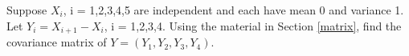 \oneproblem
Suppose $X_i$, i = 1,2,3,4,5 are independent and each have mean 0 and   
variance 1.  Let $Y_i = X_{i+1} - X_i$, i = 1,2,3,4.  Using the 
material in Section \ref{matrix}, find the covariance matrix of 
$Y = (Y_1, Y_2, Y_3, Y_4)$.

% 
% 
% 
% 
% 
% 
% 
% 
% 
% 
% 
% 

